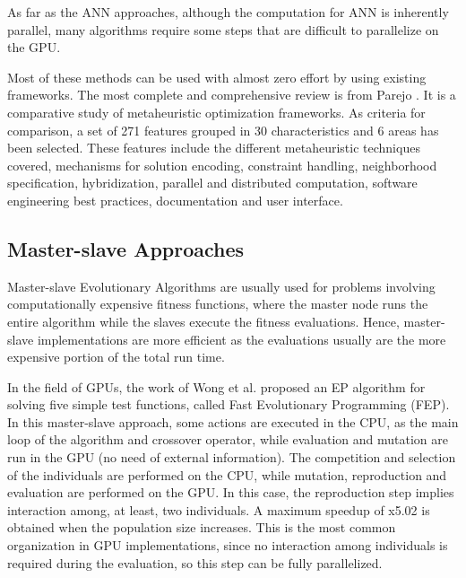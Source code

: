 \documentclass[prodmode,acmtecs]{acmsmall}
\begin{document}
As far as the ANN approaches, although the computation for ANN is inherently parallel, many algorithms require some steps that are difficult to parallelize on the GPU.

Most of these methods can be used with almost zero effort by using existing frameworks. The most complete and comprehensive review is from Parejo \cite{springerlink:10.1007/s00500-011-0754-8}. It is a comparative study of metaheuristic optimization frameworks. As criteria for comparison, a set of 271 features grouped in 30 characteristics and 6 areas has been selected. These features include the different metaheuristic techniques covered, mechanisms for solution encoding, constraint handling, neighborhood specification, hybridization, parallel and distributed computation, software engineering best practices, documentation and user interface.

\subsection{Master-slave Approaches}

Master-slave Evolutionary Algorithms are usually used for problems involving computationally expensive fitness functions, where the master node runs the entire algorithm while the slaves execute the fitness evaluations. Hence, master-slave implementations are more efficient as the evaluations usually are the more expensive portion of the total run time.

In the field of GPUs, the work of Wong et al. \cite{man-leung-wong-parallel-2005} proposed an EP algorithm for solving five simple test functions, called Fast Evolutionary Programming (FEP). In this master-slave approach, some actions are executed in the CPU, as the main loop of the algorithm and crossover operator, while evaluation and mutation are run in the GPU (no need of external information). The competition and selection of the individuals are performed on the CPU, while mutation, reproduction and evaluation are performed on the GPU. In this case, the reproduction step implies interaction among, at least, two individuals. A maximum speedup of x5.02 is obtained when the population size increases. This is the most common organization in GPU implementations, since no interaction among individuals is required during the evaluation, so this step can be fully parallelized.
\end{document}
